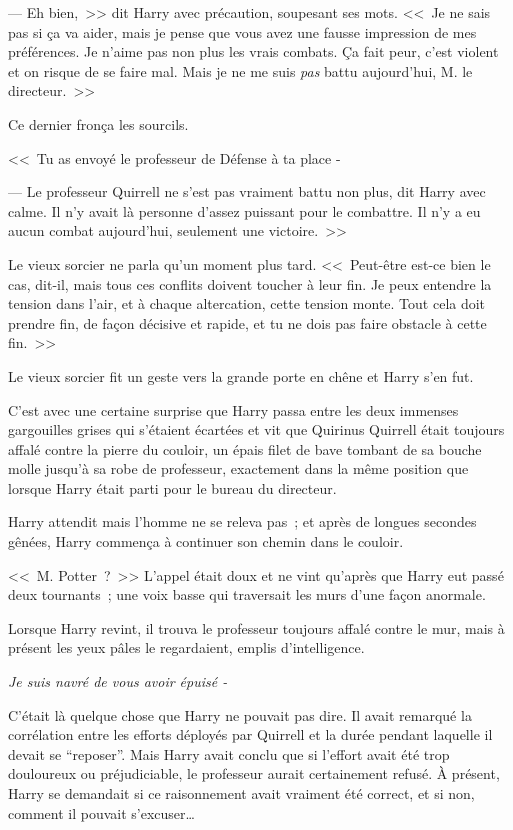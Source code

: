 --- Eh bien,~>> dit Harry avec précaution, soupesant ses mots. <<~Je ne sais pas si ça va aider, mais je pense que vous avez une fausse impression de mes préférences. Je n'aime pas non plus les vrais combats. Ça fait peur, c'est violent et on risque de se faire mal. Mais je ne me suis \emph{pas} battu aujourd'hui, M. le directeur.~>>

Ce dernier fronça les sourcils.

<<~Tu as envoyé le professeur de Défense à ta place -

--- Le professeur Quirrell ne s'est pas vraiment battu non plus, dit Harry avec calme. Il n'y avait là personne d'assez puissant pour le combattre. Il n'y a eu aucun combat aujourd'hui, seulement une victoire.~>>

Le vieux sorcier ne parla qu'un moment plus tard. <<~Peut-être est-ce bien le cas, dit-il, mais tous ces conflits doivent toucher à leur fin. Je peux entendre la tension dans l'air, et à chaque altercation, cette tension monte. Tout cela doit prendre fin, de façon décisive et rapide, et tu ne dois pas faire obstacle à cette fin.~>>

Le vieux sorcier fit un geste vers la grande porte en chêne et Harry s'en fut.

\later

C'est avec une certaine surprise que Harry passa entre les deux immenses gargouilles grises qui s'étaient écartées et vit que Quirinus Quirrell était toujours affalé contre la pierre du couloir, un épais filet de bave tombant de sa bouche molle jusqu'à sa robe de professeur, exactement dans la même position que lorsque Harry était parti pour le bureau du directeur.

Harry attendit mais l'homme ne se releva pas~; et après de longues secondes gênées, Harry commença à continuer son chemin dans le couloir.

<<~M. Potter~?~>> L'appel était doux et ne vint qu'après que Harry eut passé deux tournants~; une voix basse qui traversait les murs d'une façon anormale.

Lorsque Harry revint, il trouva le professeur toujours affalé contre le mur, mais à présent les yeux pâles le regardaient, emplis d'intelligence.

\emph{Je suis navré de vous avoir épuisé -}

C'était là quelque chose que Harry ne pouvait pas dire. Il avait remarqué la corrélation entre les efforts déployés par Quirrell et la durée pendant laquelle il devait se “reposer”. Mais Harry avait conclu que si l'effort avait été trop douloureux ou préjudiciable, le professeur aurait certainement refusé. À présent, Harry se demandait si ce raisonnement avait vraiment été correct, et si non, comment il pouvait s'excuser…

